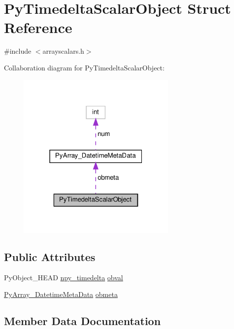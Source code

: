 \hypertarget{structPyTimedeltaScalarObject}{}\section{Py\+Timedelta\+Scalar\+Object Struct Reference}
\label{structPyTimedeltaScalarObject}


{\ttfamily \#include $<$arrayscalars.\+h$>$}



Collaboration diagram for Py\+Timedelta\+Scalar\+Object\+:
\nopagebreak
\begin{figure}[H]
\begin{center}
\leavevmode
\includegraphics[width=220pt]{structPyTimedeltaScalarObject__coll__graph}
\end{center}
\end{figure}
\subsection*{Public Attributes}
\begin{DoxyCompactItemize}
\item 
Py\+Object\+\_\+\+H\+E\+AD \hyperlink{npy__common_8h_a37d0380d114c93c437279e4ed3e8fdf8}{npy\+\_\+timedelta} \hyperlink{structPyTimedeltaScalarObject_a44e85d0dc4d7671e44ebd573614f7170}{obval}
\item 
\hyperlink{structPyArray__DatetimeMetaData}{Py\+Array\+\_\+\+Datetime\+Meta\+Data} \hyperlink{structPyTimedeltaScalarObject_a2eae1afd3d2801865e719c6100099e00}{obmeta}
\end{DoxyCompactItemize}


\subsection{Member Data Documentation}
\mbox{\label{structPyTimedeltaScalarObject_a2eae1afd3d2801865e719c6100099e00}} 
